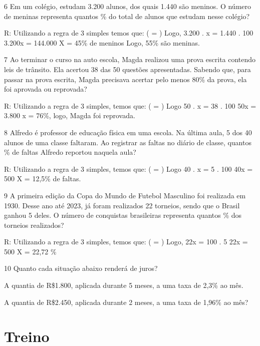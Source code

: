 {\num{6} Em um colégio, estudam 3.200 alunos, dos quais 1.440 são meninos. O
número de meninas representa quantos \% do total de alunos que estudam
nesse colégio?

R: Utilizando a regra de 3 simples temos que:
( = )
Logo, 3.200 . x = 1.440 . 100
3.200x = 144.000
X = 45\% de meninos
Logo, 55\% são meninas.

\num{7} Ao terminar o curso na auto escola, Magda realizou uma prova escrita
contendo leis de trânsito. Ela acertou 38 das 50 questões apresentadas.
Sabendo que, para passar na prova escrita, Magda precisava acertar pelo
menos 80\% da prova, ela foi aprovada ou reprovada?

R: Utilizando a regra de 3 simples, temos que:
( = )
Logo 50 . x = 38 . 100
50x = 3.800
x = 76\%, logo, Magda foi reprovada.

\num{8} Alfredo é professor de educação física em uma escola. Na última aula,
5 dos 40 alunos de uma classe faltaram. Ao registrar as faltas no diário
de classe, quantos \% de faltas Alfredo reportou naquela aula?

R: Utilizando a regra de 3 simples, temos que:
( = )
Logo 40 . x = 5 . 100
40x = 500
X = 12,5\% de faltas.

\num{9} A primeira edição da Copa do Mundo de Futebol Masculino foi realizada
em 1930. Desse ano até 2023, já foram realizados 22 torneios, sendo que
o Brasil ganhou 5 deles. O número de conquistas brasileiras representa
quantos \% dos torneios realizados?

R: Utilizando a regra de 3 simples, temos que:
( = )
Logo, 22x = 100 . 5
22x = 500
X = 22,72 \%

\num{10} Quanto cada situação abaixo renderá de juros?

\item A quantia de R\$1.800, aplicada durante 5 meses, a uma taxa de 2,3\%
ao mês.


\item A quantia de R\$2.450, aplicada durante 2 meses, a uma taxa de 1,96\% ao mês?


\section{Treino}

}
